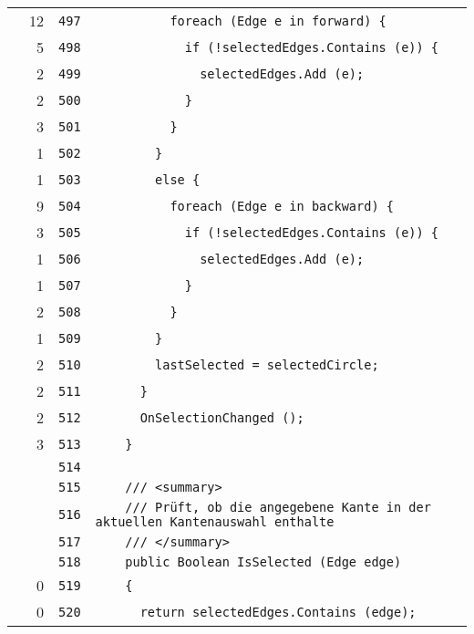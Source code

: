 \documentclass[a4paper,10pt]{article}
\begin{document}
\begin{longtable}[l]{lrrl}
\cellcolor{green} & 12 & \verb~497~ & \verb~          foreach (Edge e in forward) {~\\
\cellcolor{green} & 5 & \verb~498~ & \verb~            if (!selectedEdges.Contains (e)) {~\\
\cellcolor{green} & 2 & \verb~499~ & \verb~              selectedEdges.Add (e);~\\
\cellcolor{green} & 2 & \verb~500~ & \verb~            }~\\
\cellcolor{green} & 3 & \verb~501~ & \verb~          }~\\
\cellcolor{green} & 1 & \verb~502~ & \verb~        }~\\
\cellcolor{green} & 1 & \verb~503~ & \verb~        else {~\\
\cellcolor{green} & 9 & \verb~504~ & \verb~          foreach (Edge e in backward) {~\\
\cellcolor{green} & 3 & \verb~505~ & \verb~            if (!selectedEdges.Contains (e)) {~\\
\cellcolor{green} & 1 & \verb~506~ & \verb~              selectedEdges.Add (e);~\\
\cellcolor{green} & 1 & \verb~507~ & \verb~            }~\\
\cellcolor{green} & 2 & \verb~508~ & \verb~          }~\\
\cellcolor{green} & 1 & \verb~509~ & \verb~        }~\\
\cellcolor{green} & 2 & \verb~510~ & \verb~        lastSelected = selectedCircle;~\\
\cellcolor{green} & 2 & \verb~511~ & \verb~      }~\\
\cellcolor{green} & 2 & \verb~512~ & \verb~      OnSelectionChanged ();~\\
\cellcolor{green} & 3 & \verb~513~ & \verb~    }~\\
\cellcolor{gray} &  & \verb~514~ & \verb~~\\
\cellcolor{gray} &  & \verb~515~ & \verb~    /// <summary>~\\
\cellcolor{gray} &  & \verb~516~ & \verb~    /// Prüft, ob die angegebene Kante in der aktuellen Kantenauswahl enthalte~\\
\cellcolor{gray} &  & \verb~517~ & \verb~    /// </summary>~\\
\cellcolor{gray} &  & \verb~518~ & \verb~    public Boolean IsSelected (Edge edge)~\\
\cellcolor{red} & 0 & \verb~519~ & \verb~    {~\\
\cellcolor{red} & 0 & \verb~520~ & \verb~      return selectedEdges.Contains (edge);~\\

\end{longtable}
\end{document}
